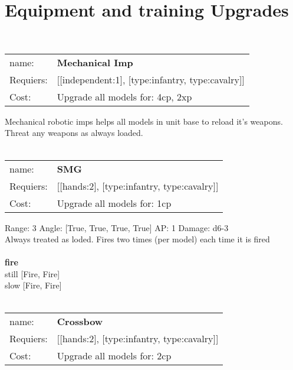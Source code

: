\section{Equipment and training Upgrades}\ \\
\begin{tabular}{ll}
name: & {\bf Mechanical Imp } \\
Requiers: & [[independent:1], [type:infantry, type:cavalry]] \\
Cost: & Upgrade all models for: 4cp, 2xp \\
\end{tabular}

Mechanical robotic imps helps all models in unit base to reload it's weapons. Threat any weapons as always loaded.\\ 









\ \\
\begin{tabular}{ll}
name: & {\bf SMG } \\
Requiers: & [[hands:2], [type:infantry, type:cavalry]] \\
Cost: & Upgrade all models for: 1cp \\
\end{tabular}



Range: 3  Angle: [True, True, True, True] AP: 1 Damage: d6-3 \\
Always treated as loded. Fires two times (per model) each time it is fired\\ 







\ \\ {\bf fire } \\
still [Fire, Fire] \\
slow [Fire, Fire] \\

\ \\
\begin{tabular}{ll}
name: & {\bf Crossbow } \\
Requiers: & [[hands:2], [type:infantry, type:cavalry]] \\
Cost: & Upgrade all models for: 2cp \\
\end{tabular}



